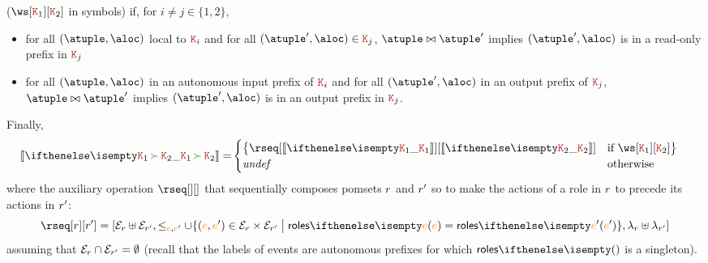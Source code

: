 ($\ws[\aK_1][\aK_2]$ in symbols) if, for $i \neq j \in \{1,2\}$,
%
\begin{itemize}
\item for all $(\atuple,\aloc)$ local to $\aK_i$ and for all
  $(\atuple', \aloc) \in \aK_j$, $\atuple \matches \atuple'$ implies
  $(\atuple', \aloc)$ is in a read-only prefix in $\aK_j$
\item for all $(\atuple,\aloc)$ in an autonomous input prefix of
  $\aK_i$ and for all $(\atuple', \aloc)$ in an output prefix of
  $\aK_j$, $\atuple \matches \atuple'$ implies $(\atuple',\aloc)$ is
  in an output prefix in $\aK_j$.
\end{itemize}
%
Finally,
\begin{align*}
  \ksem{\aK_1 \seqop \aK_2} =
  &
    \begin{cases}
      \big\{
      \rseq[\ksem{\aK_1}][\ksem{\aK_2}] & \text{if } \ws[\aK_1][\aK_2]
      \big\}
      \\
      \mathit{undef} & \text{otherwise}
    \end{cases}
\end{align*}
where the auxiliary operation $\rseq[][]$ that sequentially composes
pomsets $r$ and $r'$ so to make the actions of a role in
$r$ to precede its actions in $r'$:
\[
  \rseq[\apom][\apom'] = 
  [\esetof{\apom} \uplus \esetof{\apom'},
  \leq_{\ae,\ae'} \cup \{(\ae,\ae') \in \esetof \apom \times \esetof{\apom'} \sst \roles{\ae} = \roles{\ae'}\},
  \alfof{\apom} \uplus \alfof{\apom'}]
\]
assuming that $\mathcal{E}_{r} \cap \mathcal{E}_{r'} = \emptyset$ (recall
that the labels of events are autonomous prefixes for which $\roles{}$
is a singleton).
%
%
%
%
%


